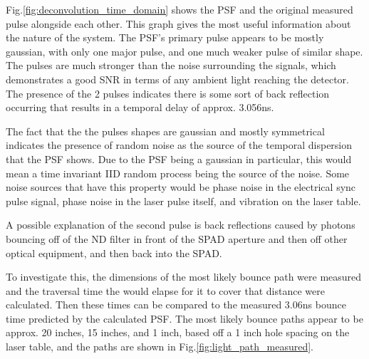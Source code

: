 \documentclass[a4paper]{article}
\begin{document}
Fig.\ref{fig:deconvolution_time_domain} shows the PSF and the original measured pulse alongside each other. This graph gives the most useful information about the nature of the system. The PSF's primary pulse appears to be mostly gaussian, with only one major pulse, and one much weaker pulse of similar shape. The pulses are much stronger than the noise surrounding the signals, which demonstrates a good SNR in terms of any ambient light reaching the detector. The presence of the 2 pulses indicates there is some sort of back reflection occurring that results in a temporal delay of approx. 3.056ns.

The fact that the the pulses shapes are gaussian and mostly symmetrical indicates the presence of random noise as the source of the temporal dispersion that the PSF shows. Due to the PSF being a gaussian in particular, this would mean a time invariant IID random process being the source of the noise. Some noise sources that have this property would be phase noise in the electrical sync pulse signal, phase noise in the laser pulse itself, and vibration on the laser table.
\newline

A possible explanation of the second pulse is back reflections caused by photons bouncing off of the ND filter in front of the SPAD aperture and then off other optical equipment, and then back into the SPAD.

To investigate this, the dimensions of the most likely bounce path were measured and the traversal time the would elapse for it to cover that distance were calculated. Then these times can be compared to the measured 3.06ns bounce time predicted by the calculated PSF.
The most likely bounce paths appear to be approx. 20 inches, 15 inches, and 1 inch, based off a 1 inch hole spacing on the laser table, and the paths are shown in Fig.\ref{fig:light_path_measured}.

%
%
\end{document}
